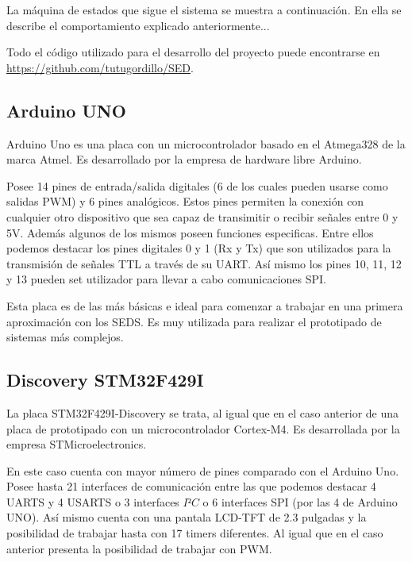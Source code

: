 La m\'aquina de estados que sigue el sistema se muestra a
continuaci\'on. En ella se describe el comportamiento explicado
anteriormente...

Todo el c\'odigo utilizado para el desarrollo del proyecto puede
encontrarse en \url{https://github.com/tutugordillo/SED}.
\subsection{Arduino UNO}\label{subsec:arduino}
Arduino Uno es una placa con un microcontrolador basado en el
Atmega328 de la marca Atmel. Es desarrollado por la empresa de
hardware libre Arduino.

 Posee 14 pines de entrada/salida digitales (6 de los cuales
pueden usarse como salidas PWM) y 6 pines anal\'ogicos. Estos pines
permiten la conexi\'on con cualquier otro dispositivo que sea capaz de
transimitir o recibir señales entre 0 y 5V. Adem\'as algunos de los
mismos poseen funciones especificas. Entre ellos podemos destacar 
los pines digitales 0 y 1 (Rx y Tx) que son utilizados para la transmisi\'on de
señales TTL a trav\'es de su UART. As\'i mismo los pines 10, 11, 12 y
13 pueden set utilizador para llevar a cabo comunicaciones SPI.

Esta placa es de las m\'as b\'asicas e ideal para comenzar a trabajar
en una primera aproximaci\'on con los SEDS. Es muy utilizada para
realizar el prototipado de sistemas m\'as complejos.

\subsection{Discovery STM32F429I}\label{subsec:discovery}

La placa STM32F429I-Discovery se trata, al igual que en el caso
anterior de una placa de prototipado con un microcontrolador
Cortex-M4. Es desarrollada por la empresa STMicroelectronics. 

En este
caso cuenta con mayor n\'umero de pines comparado con el Arduino
Uno. Posee hasta 21 interfaces de comunicaci\'on entre las que podemos
destacar 4 UARTS y 4 USARTS o 3 interfaces $I²C$ o 6 interfaces SPI
(por las 4 de Arduino UNO). As\'i mismo cuenta
con una pantala LCD-TFT de 2.3 pulgadas y la posibilidad de trabajar
hasta con 17 timers diferentes. Al igual que en el caso anterior
presenta la posibilidad de trabajar con PWM.

